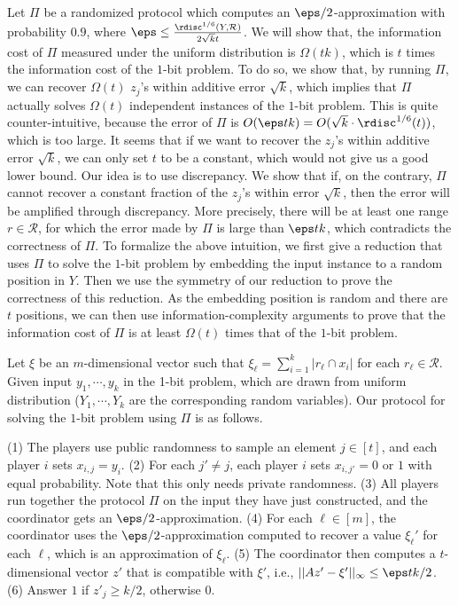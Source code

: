 Let $\Pi$ be a randomized protocol which computes an $\eps/2$-approximation with probability $0.9$, where $\eps\le\frac{\rdisc^{1/6}(Y, \mathcal{R})}{2\sqrt{k}t}$. We will show that, the information cost of $\Pi$ measured under the uniform distribution is $\Omega(tk)$, which is $t$ times the information cost of the $1$-bit problem. To do so, we show that, by running $\Pi$, we can recover $\Omega(t)$ $z_j$'s within additive error
$\sqrt{k}$, which implies that $\Pi$ actually solves $\Omega(t)$ independent instances of the $1$-bit problem. This is quite counter-intuitive, because the error of $\Pi$ is $O(\eps t k)=O(\sqrt{k}\cdot \rdisc^{1/6}(t))$, which is too large.  It seems that if we want to recover the $z_j$'s within additive error $\sqrt{k}$, we can only set $t$ to be a constant, which would not give us a good lower bound. Our idea is to use discrepancy. We show that if, on the contrary, $\Pi$ cannot recover a constant fraction of the $z_j$'s within error $\sqrt{k}$, then the error will be amplified through discrepancy. More precisely, there will be at least one range $r\in \mathcal{R}$, for which the error made by $\Pi$ is large than $\eps t k$, which contradicts the correctness of $\Pi$.
To formalize the above intuition, we first give a reduction that uses $\Pi$ to solve the $1$-bit problem by embedding the input instance to a random position in $Y$. Then we use the symmetry of our reduction to prove the correctness of this reduction. As the embedding position is random and there are $t$ positions, we can then use information-complexity arguments to prove that the information cost of $\Pi$ is at least $\Omega(t)$ times that of the $1$-bit problem.

 Let $\xi$ be an $m$-dimensional vector such that $\xi_\ell=\sum_{i=1}^k |r_\ell
\cap x_i|$ for each $r_\ell\in \mathcal{R}$. Given input $y_1,\cdots, y_k$ in the 1-bit problem, which are drawn from uniform distribution ($Y_1, \cdots, Y_k$ are the corresponding random variables).  Our protocol for solving the $1$-bit problem using $\Pi$ is as follows.

(1) The players use public randomness to sample an element $j\in [t]$, and each player $i$ sets $x_{i,j}=y_i$.
(2) For each $j'\neq j$, each player $i$ sets $x_{i,j'}=0$ or $1$ with equal probability. Note that this only needs private randomness.
(3) All  players run together the protocol $\Pi$ on the input they have just constructed, and the coordinator gets an $\eps/2$-approximation.
(4) For each $\ell\in[m]$, the coordinator uses the $\eps/2$-approximation computed to recover a value $\xi_\ell'$ for each $\ell$, which is an approximation of $\xi_\ell$.
(5) The coordinator then computes a $t$-dimensional vector $z'$ that is compatible with $\xi'$, i.e., $||Az'-\xi'||_{\infty}\le \eps tk/2$.
(6) Answer $1$ if $z'_j\ge k/2$, otherwise $0$.

